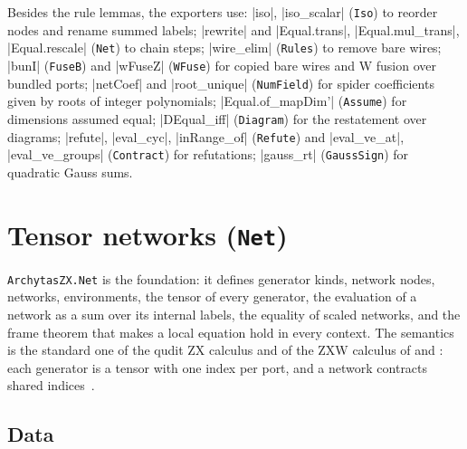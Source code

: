 Besides the rule lemmas, the exporters use: \lean|iso|, \lean|iso_scalar| (\texttt{Iso}) to reorder
nodes and rename summed labels; \lean|rewrite| and \lean|Equal.trans|, \lean|Equal.mul_trans|,
\lean|Equal.rescale| (\texttt{Net}) to chain steps; \lean|wire_elim| (\texttt{Rules}) to remove bare
wires; \lean|bunI| (\texttt{FuseB}) and \lean|wFuseZ| (\texttt{WFuse}) for copied bare wires and W
fusion over bundled ports; \lean|netCoef| and \lean|root_unique| (\texttt{NumField}) for spider
coefficients given by roots of integer polynomials; \lean|Equal.of_mapDim'| (\texttt{Assume}) for
dimensions assumed equal; \lean|DEqual_iff| (\texttt{Diagram}) for the restatement over diagrams;
\lean|refute|, \lean|eval_cyc|, \lean|inRange_of| (\texttt{Refute}) and \lean|eval_ve_at|,
\lean|eval_ve_groups| (\texttt{Contract}) for refutations; \lean|gauss_rt| (\texttt{GaussSign}) for
quadratic Gauss sums.

\section{Tensor networks (\texttt{Net})}\label{sec:lean-core-net}

\texttt{ArchytasZX.Net} is the foundation: it defines generator kinds, network nodes, networks,
environments, the tensor of every generator, the evaluation of a network as a sum over its internal
labels, the equality of scaled networks, and the frame theorem that makes a local equation hold in
every context. The semantics is the standard one of the qudit ZX calculus and of the ZXW calculus of
\citet{poor2023zxw} and \citet{wang2023qufinitezxw}: each generator is a tensor with one index per
port, and a network contracts shared indices~\cite{coecke2011interacting}.

\subsection{Data}\label{sec:lean-core-net-data}

